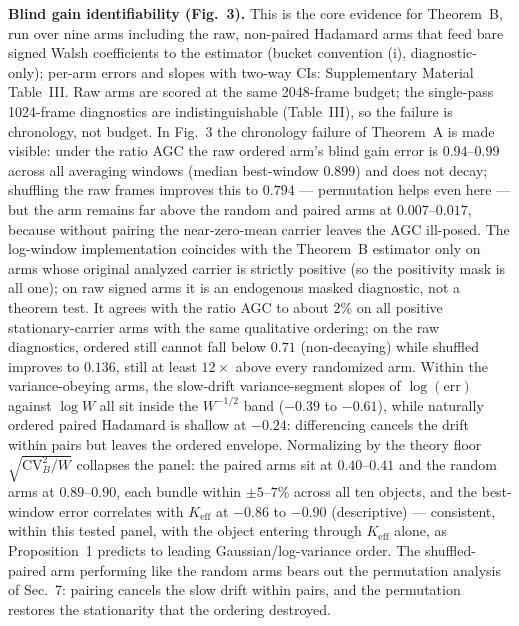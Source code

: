\noindent\textbf{Blind gain identifiability (Fig.~3).} This is the core evidence for Theorem~B, run over nine arms including the raw, non-paired Hadamard arms that feed bare signed Walsh coefficients to the estimator (bucket convention (i), diagnostic-only); per-arm errors and slopes with two-way CIs: Supplementary Material Table~III. Raw arms are scored at the same 2048-frame budget; the single-pass 1024-frame diagnostics are indistinguishable (Table~III), so the failure is chronology, not budget. In Fig.~3 the chronology failure of Theorem~A is made visible: under the ratio AGC the raw ordered arm's blind gain error is $0.94$--$0.99$ across all averaging windows (median best-window $0.899$) and does not decay; shuffling the raw frames improves this to $0.794$ --- permutation helps even here --- but the arm remains far above the random and paired arms at $0.007$--$0.017$, because without pairing the near-zero-mean carrier leaves the AGC ill-posed. The log-window implementation coincides with the Theorem~B estimator only on arms whose original analyzed carrier is strictly positive (so the positivity mask is all one); on raw signed arms it is an endogenous masked diagnostic, not a theorem test. It agrees with the ratio AGC to about $2\%$ on all positive stationary-carrier arms with the same qualitative ordering; on the raw diagnostics, ordered still cannot fall below $0.71$ (non-decaying) while shuffled improves to $0.136$, still at least $12\times$ above every randomized arm. Within the variance-obeying arms, the slow-drift variance-segment slopes of $\log(\mathrm{err})$ against $\log W$ all sit inside the $W^{-1/2}$ band ($-0.39$ to $-0.61$), while naturally ordered paired Hadamard is shallow at $-0.24$: differencing cancels the drift within pairs but leaves the ordered envelope. Normalizing by the theory floor $\sqrt{\mathrm{CV}_B^2/W}$ collapses the panel: the paired arms sit at $0.40$--$0.41$ and the random arms at $0.89$--$0.90$, each bundle within $\pm5$--$7\%$ across all ten objects, and the best-window error correlates with $K_{\mathrm{eff}}$ at $-0.86$ to $-0.90$ (descriptive) --- consistent, within this tested panel, with the object entering through $K_{\mathrm{eff}}$ alone, as Proposition~1 predicts to leading Gaussian/log-variance order. The shuffled-paired arm performing like the random arms bears out the permutation analysis of Sec.~7: pairing cancels the slow drift within pairs, and the permutation restores the stationarity that the ordering destroyed.

